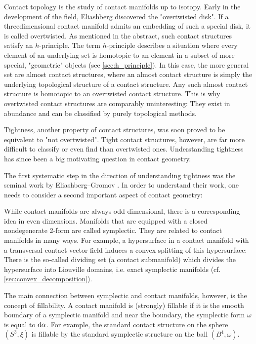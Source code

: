 Contact topology is the study of contact manifolds up to isotopy. 
Early in the development of the field, Eliashberg discovered the "overtwisted disk".
If a threedimensional contact manifold admits an embedding of such a special disk, it is called overtwisted.
As mentioned in the abstract, such contact structures satisfy an $h$-principle.
The term $h$-principle describes a situation where every element of an underlying set is homotopic to an
element in a subset of more special, "geometric" objects (see \cref{sec:h_principle}).
In this case, the more general set are almost contact structures, where an almost contact structure
is simply the underlying topological structure of a contact structure.
Any such almost contact structure is homotopic to an overtwisted contact structure.
This is why overtwisted contact structures are comparably uninteresting: They exist
in abundance and can be classified by purely topological methods.

Tightness, another property of contact structures, was soon proved to be equivalent to "not overtwisted".
Tight contact structures, however, are far more difficult to classify or even find than overtwisted ones.
Understanding tightness has since been a big motivating question in contact geometry.

The first systematic step in the direction of understanding tightness was the seminal work
by Eliashberg--Gromov \cite{Gromov85, Eliashberg91}. In order to understand their work,
one needs to consider a second important aspect of contact geometry:

While contact manifolds are always odd-dimensional, there is a corresponding idea in even dimensions.
Manifolds that are equipped with a closed nondegenerate 2-form are called symplectic. They are related
to contact manifolds in many ways.
For example, a hypersurface in a contact manifold with a transversal contact vector field
induces a convex splitting of this hypersurface: There is the so-called dividing set (a contact submanifold)
which divides the hypersurface into Liouville domains, i.e. exact symplectic manifolds (cf. \cref{sec:convex_decomposition}).

The main connection between symplectic and contact manifolds, however, is the concept of fillability.
A contact manifold is (strongly) fillable if it is the smooth boundary of a symplectic manifold and
near the boundary, the symplectic form $\omega$ is equal to $\mathrm{d} \alpha$.
For example, the standard contact structure on the sphere $(S^3, \xi)$ is fillable
by the standard symplectic structure on the ball $(B^4, \omega)$.

